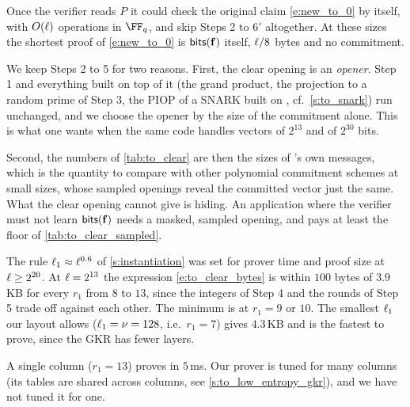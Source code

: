 \documentclass[11pt,letterpaper,usenames,dvipsnames]{article}
\begin{document}
\begin{remark}
Once the verifier reads $P$ it could check the original claim \eqref{e:new_to_0} by itself, with $O(\ell)$ operations in $\FF_q$, and skip Steps 2 to $6'$ altogether. At these sizes the shortest proof of \eqref{e:new_to_0} is $\mathsf{bits}(\mathbf{f})$ itself, $\ell/8$ bytes and no commitment.

We keep Steps 2 to 5 for two reasons. First, the clear opening is an \emph{opener}. Step 1 and everything built on top of it (the grand product, the projection to a random prime of Step 3, the PIOP of a SNARK built on \ftwoz, cf.\ \cref{s:to_snark}) run unchanged, and we choose the opener by the size of the commitment alone. This is what one wants when the same code handles vectors of $2^{13}$ and of $2^{30}$ bits.

Second, the numbers of \cref{tab:to_clear} are then the sizes of \ftwoz's own messages, which is the quantity to compare with other polynomial commitment schemes at small sizes, whose sampled openings reveal the committed vector just the same. What the clear opening cannot give is hiding. An application where the verifier must not learn $\mathsf{bits}(\mathbf{f})$ needs a masked, sampled opening, and pays at least the floor of \cref{tab:to_clear_sampled}.
\end{remark}

\begin{remark}
The rule $\ell_1\approx\ell^{0.6}$ of \cref{s:instantiation} was set for prover time and proof size at $\ell\ge 2^{20}$. At $\ell=2^{13}$ the expression \eqref{e:to_clear_bytes} is within $100$ bytes of $3.9$\,KB for every $r_1$ from $8$ to $13$, since the integers of Step 4 and the rounds of Step 5 trade off against each other. The minimum is at $r_1=9$ or $10$. The smallest $\ell_1$ our layout allows ($\ell_1=\nu=128$, i.e.\ $r_1=7$) gives $4.3$\,KB and is the fastest to prove, since the GKR has fewer layers.

A single column ($r_1=13$) proves in $5$\,ms. Our prover is tuned for many columns (its tables are shared across columns, see \cref{s:to_low_entropy_gkr}), and we have not tuned it for one.
\end{remark}
\end{document}

